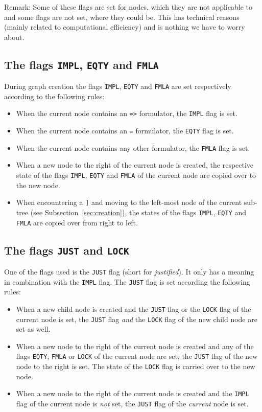 \documentclass[british]{article}
\newcommand\prv{bc}
\newcommand\m[1]{\texttt{#1}}
\begin{document}
Remark: Some of these flags are set for nodes, which they are not applicable to
and some flags are not set, where they could be.
This has technical reasons (mainly related to computational efficiency) and is
nothing we have to worry about.

\pagebreak{}

\subsection{The flags \texttt{IMPL}, \texttt{EQTY} and \texttt{FMLA}}
During graph creation the flags \texttt{IMPL},
\texttt{EQTY} and \texttt{FMLA} are set respectively according to the following
rules:

\begin{itemize}
	\item
		When the current node contains an \m{=>} formulator, the \texttt{IMPL}
		flag is set.
	\item
		When the current node contains an \m{=} formulator, the \texttt{EQTY}
		flag is set.
	\item
		When the current node contains any other formulator, the \texttt{FMLA}
		flag is set.
	\item
		When a new node to the right of the current node is created, the
		respective state of the flags \texttt{IMPL}, \texttt{EQTY} and
		\texttt{FMLA} of the current node are copied over to the new node.
	\item
		When encountering a \m{]} and moving to the left-most node of the
		current sub-tree (see Subsection~\ref{sec:creation}), the states of the
		flags \texttt{IMPL}, \texttt{EQTY} and \texttt{FMLA} are copied over
		from right to left.
\end{itemize}

\subsection{The flags \texttt{JUST} and \texttt{LOCK}}

One of the flags used is the \texttt{JUST} flag (short for \emph{justified}). It
only has a meaning in combination with the \texttt{IMPL} flag. 
\medskip
The \texttt{JUST} flag is set according the following rules:

\begin{itemize}
	\item
		When a new child node is created and the \texttt{JUST} flag or the
		\texttt{LOCK} flag of the current node is set, the \texttt{JUST} flag
		\emph{and} the \texttt{LOCK} flag of the new child node are set as well. 
	\item
		When a new node to the right of the current node is created and any of
		the flags \texttt{EQTY}, \texttt{FMLA} or \texttt{LOCK} of the current
		node are set, the \texttt{JUST} flag of the new node to the right is
		set. The state of the \texttt{LOCK} flag is carried over to the new
		node.
	\item
		When a new node to the right of the current node is created and the
		\texttt{IMPL} flag of the current node is \emph{not} set, the
		\texttt{JUST} flag of the \emph{current} node is set.
\end{itemize}
\end{document}
